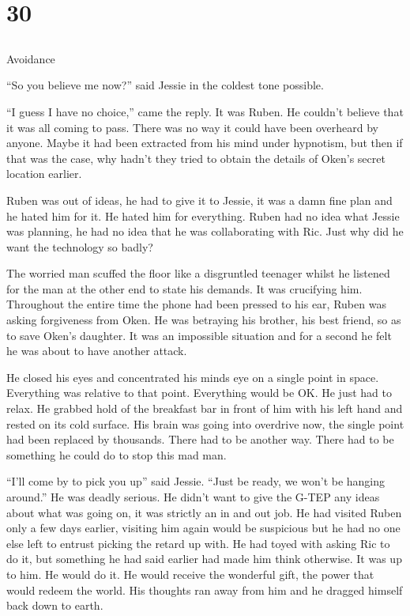 \chapter{30}
\section{}
Avoidance  

``So you believe me now?'' said Jessie in the coldest tone possible.

``I guess I have no choice,'' came the reply.  It was Ruben.  He couldn't believe that it was all coming to pass.  There was no way it could have been overheard by anyone.  Maybe it had been extracted from his mind under hypnotism, but then if that was the case, why hadn't they tried to obtain the details of Oken's secret location earlier.  

Ruben was out of ideas, he had to give it to Jessie, it was a damn fine plan and he hated him for it.  He hated him for everything.  Ruben had no idea what Jessie was planning, he had no idea that he was collaborating with Ric.  Just why did he want the technology so badly?

The worried man scuffed the floor like a disgruntled teenager whilst he listened for the man at the other end to state his demands.  It was crucifying him.  Throughout the entire time the phone had been pressed to his ear, Ruben was asking forgiveness from Oken.  He was betraying his brother, his best friend, so as to save Oken's daughter.   It was an impossible situation and for a second he felt he was about to have another attack.  

He closed his eyes and concentrated his minds eye on a single point in space.  Everything was relative to that point.  Everything would be OK.  He just had to relax.  He grabbed hold of the breakfast bar in front of him with his left hand and rested on its cold surface.  His brain was going into overdrive now, the single point had been replaced by thousands.  There had to be another way.  There had to be something he could do to stop this mad man.

``I'll come by to pick you up'' said Jessie.  ``Just be ready, we won't be hanging around.''  He was deadly serious.  He didn't want to give the G-TEP any ideas about what was going on, it was strictly an in and out job.  He had visited Ruben only a few days earlier, visiting him again would be suspicious but he had no one else left to entrust picking the retard up with.  He had toyed with asking Ric to do it, but something he had said earlier had made him think otherwise.  It was up to him.  He would do it.  He would receive the wonderful gift, the power that would redeem the world.  His thoughts ran away from him and he dragged himself back down to earth.

